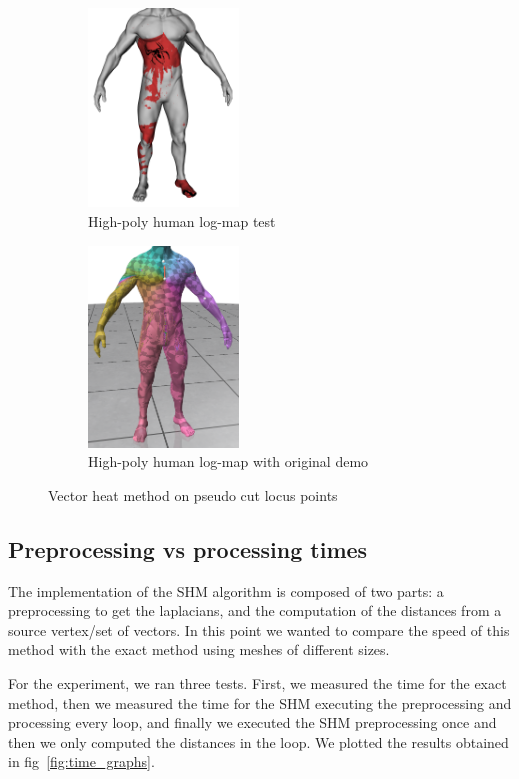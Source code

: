 \documentclass[sigconf]{acmart}
\begin{document}
\begin{figure}[htbp]
  \centering
  \hfill
  \begin{subfigure}[b]{0.23\textwidth}
    \centering
    \includegraphics[width=4cm]{human_spiderman_high.png}
    \caption{High-poly human log-map test}
    \label{fig:high_poly_human}
  \end{subfigure}
  \begin{subfigure}[b]{0.23\textwidth}
    \centering
    \includegraphics[width=4cm]{log_map_wrong.png}
    \caption{High-poly human log-map with original demo}
    \label{fig:high_poly_human_original_demo}
  \end{subfigure}
  \caption{Vector heat method on pseudo cut locus points}
  \label{fig:cut_locus_vectors}
\end{figure}

\subsection{Preprocessing vs processing times}

The implementation of the SHM algorithm is composed of two parts:
a preprocessing to get the laplacians, and the computation of the 
distances from a source vertex/set of vectors. In this point we wanted to compare the speed of this method with
the exact method using meshes of different sizes. 

For the experiment, we ran three tests. First, we measured the time for the exact method,
then we measured the time for the SHM executing the preprocessing and processing
every loop, and finally we executed the SHM preprocessing once and then we only computed
the distances in the loop. We plotted the results obtained in fig~\ref{fig:time_graphs}. 
\end{document}
